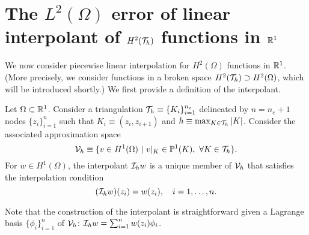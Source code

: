 \begin{proposition}
\end{proposition}


\section{The $L^2(\Omega)$ error of linear interpolant of $H^2(\mathcal{T}_h)$ functions in $\mathbb{R}^1$}
\label{sec:th_interp_l2_h2}
We now consider piecewise linear interpolation for $H^2(\Omega)$ functions in $\mathbb{R}^1$.  (More precisely, we consider functions in a broken space $H^2(\mathcal{T}_h) \supset H^2(\Omega)$, which will be introduced shortly.)  We first provide a definition of the interpolant.
\begin{definition}
  \label{def:th_lin_interp_1d}
  Let $\Omega \subset \mathbb{R}^1$.  Consider a triangulation $\mathcal{T}_h \equiv \{K_i\}_{i=1}^{n_e}$ delineated by $n = n_e + 1$ nodes $\{z_i\}_{i=1}^{n}$ such that $K_i \equiv (z_i,z_{i+1})$ and $h \equiv \max_{K \in \mathcal{T}_h} |K|$.  Consider the associated approximation space
\begin{equation*}
  \mathcal{V}_h \equiv \{ v \in H^1(\Omega) \ | \ v|_K \in \mathbb{P}^1(K), \ \forall K \in \mathcal{T}_h \} .
\end{equation*}
For $w \in H^1(\Omega)$, the interpolant $\mathcal{I}_h w$ is a unique member of $\mathcal{V}_h$ that satisfies the interpolation condition
\begin{equation*}
  (\mathcal{I}_h w)(z_i) = w(z_i), \quad i = 1,\dots, n.
\end{equation*}
\end{definition}
Note that the construction of the interpolant is straightforward given a Lagrange basis $\{\phi_i\}_{i=1}^n$ of $\mathcal{V}_h$: $\mathcal{I}_h w = \sum_{i=1}^n w(z_i) \phi_i$.


